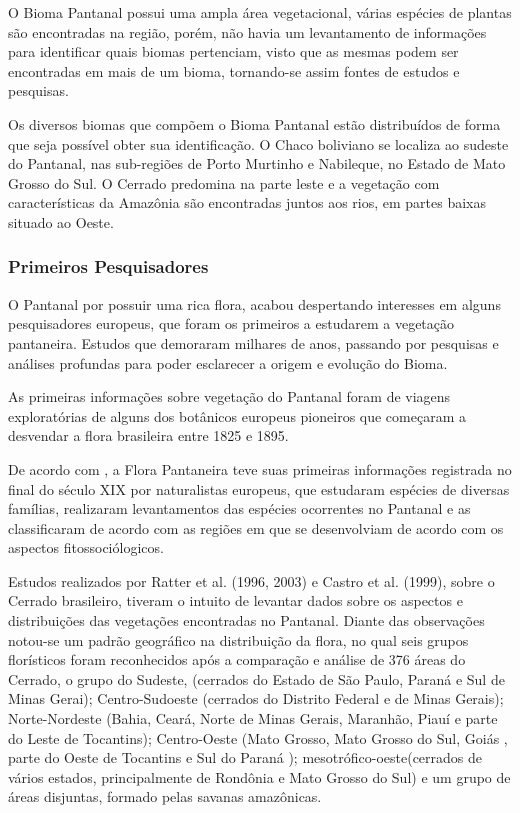 O Bioma Pantanal possui uma ampla área vegetacional, várias espécies de plantas são encontradas na região, porém, não havia um levantamento de informações para  identificar  quais biomas pertenciam, visto que as mesmas podem ser encontradas em mais de um bioma, tornando-se assim fontes de estudos e pesquisas.		

Os diversos biomas que compõem o Bioma Pantanal estão distribuídos de forma que seja possível obter sua identificação. O Chaco boliviano se localiza ao sudeste do Pantanal, nas sub-regiões de Porto Murtinho e Nabileque, no Estado de Mato Grosso do Sul. O Cerrado predomina na parte leste e a vegetação com características da Amazônia são encontradas juntos aos rios, em partes baixas situado ao Oeste.

\subsubsection{Primeiros Pesquisadores}

O Pantanal por possuir uma rica flora, acabou despertando interesses em alguns pesquisadores europeus, que foram os primeiros a estudarem a vegetação pantaneira. Estudos que demoraram milhares de anos, passando por pesquisas e análises profundas para poder esclarecer a origem e evolução do Bioma.

\begin{citacao}
	As primeiras informações sobre vegetação do Pantanal foram de viagens exploratórias de alguns dos botânicos europeus pioneiros que começaram a desvendar a flora brasileira entre 1825 e 1895. \cite{pott2009vegetaccao}
\end{citacao}

De acordo com , a Flora Pantaneira teve suas primeiras informações registrada no final do século XIX por naturalistas europeus, que estudaram espécies de diversas famílias, realizaram levantamentos das espécies ocorrentes no Pantanal e as classificaram de acordo com as regiões em que se desenvolviam de acordo com os aspectos fitossociólogicos.

Estudos realizados por  Ratter et al. (1996, 2003) e Castro et al. (1999), sobre o Cerrado brasileiro, tiveram o intuito de levantar dados sobre os aspectos e distribuições das vegetações encontradas no Pantanal. Diante das observações notou-se um padrão geográfico na distribuição da flora, no qual seis grupos florísticos foram reconhecidos após a comparação e análise de 376 áreas do Cerrado, o grupo do Sudeste, (cerrados do Estado de São Paulo, Paraná e Sul de Minas Gerai); Centro-Sudoeste (cerrados do Distrito Federal e de Minas Gerais); Norte-Nordeste (Bahia, Ceará, Norte de Minas Gerais, Maranhão, Piauí e parte do Leste de Tocantins); Centro-Oeste (Mato Grosso, Mato Grosso do Sul, Goiás , parte do Oeste de Tocantins e Sul do Paraná ); mesotrófico-oeste(cerrados de vários estados, principalmente de Rondônia e Mato Grosso do Sul) e um grupo de áreas disjuntas, formado pelas savanas amazônicas. \cite{souza2006origem}

